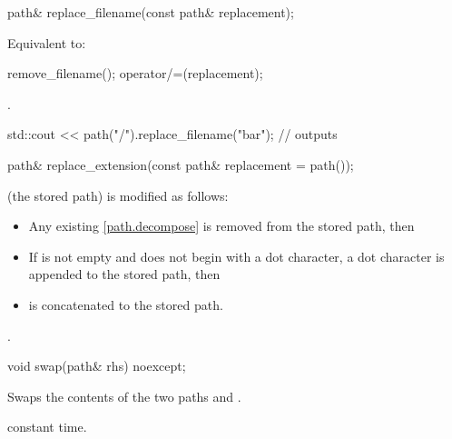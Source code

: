 %
\begin{itemdecl}
path& replace_filename(const path& replacement);
\end{itemdecl}

\begin{itemdescr}
\pnum
\effects
Equivalent to:
\begin{codeblock}
remove_filename();
operator/=(replacement);
\end{codeblock}

\pnum
\returns {}.

\pnum
\begin{example}
\begin{codeblock}
std::cout << path("/").replace_filename("bar");     // outputs 
\end{codeblock}
\end{example}
\end{itemdescr}

%
\begin{itemdecl}
path& replace_extension(const path& replacement = path());
\end{itemdecl}

\begin{itemdescr}
\pnum
\effects {} (the stored path) is modified as follows:
  \begin{itemize}
\item Any existing \ref{path.decompose}\tcode{)} is removed from the stored path,
    then
\item If  is not empty and does not begin with a dot
    character, a dot character is appended to the stored path, then
\item
   is concatenated to the stored path.
  \end{itemize}

\pnum
\returns {}.
\end{itemdescr}

%
\begin{itemdecl}
void swap(path& rhs) noexcept;
\end{itemdecl}

\begin{itemdescr}
\pnum
\effects Swaps the contents of the two paths  and
.

\pnum
\complexity constant time.
\end{itemdescr}

